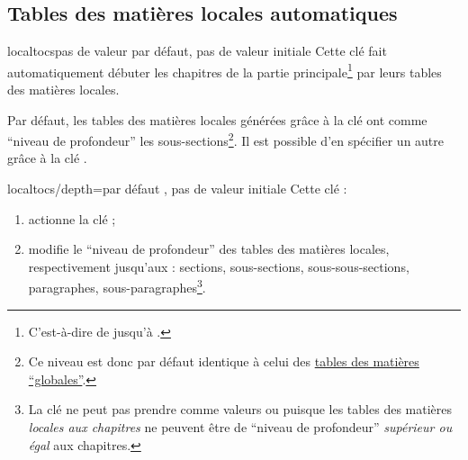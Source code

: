 \subsection{Tables des matières locales automatiques}
\label{sec-localtoc}%
%

%
%

\begin{docKey}[][doc new=2016-10-30]{localtocs}{}{pas de valeur par défaut, pas
    de valeur initiale}
  Cette clé fait automatiquement débuter les chapitres de la partie
  principale\footnote{C'est-à-dire de  jusqu'à
    .} par leurs tables des matières locales.
\end{docKey}

Par défaut, les tables des matières locales générées grâce à la clé
 ont comme \enquote{niveau de profondeur} les
sous-sections\footnote{Ce niveau est donc par défaut identique à celui des
  \hyperref[sec-table-des-matieres]{tables des matières
    \enquote{globales}}.}. Il est possible d'en spécifier un autre grâce à la
clé .

{%
  \begin{docKey}[][doc
    new=2016-10-30]{localtocs/depth}{=\textbar{}\textbar{}\textbar{}\textbar{}}{par
      défaut , pas de valeur initiale}
    Cette clé :
    \begin{enumerate}
    \item actionne la clé  ;
    \item modifie le \enquote{niveau de profondeur} des tables des matières
      locales, respectivement jusqu'aux : sections, sous-sections,
      sous-sous-sections, paragraphes, sous-paragraphes\footnote{La clé
         ne peut pas prendre comme valeurs
         ou  puisque les tables des matières
        \emph{locales aux chapitres} ne peuvent être de \enquote{niveau de
          profondeur} \emph{supérieur ou égal} aux chapitres.}.
    \end{enumerate}

\end{docKey}
}

